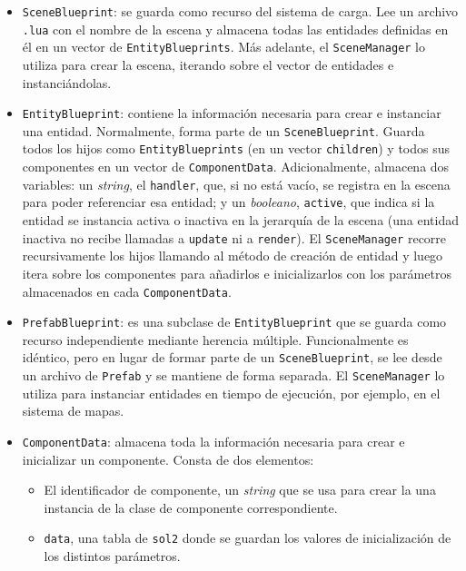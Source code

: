 \begin{itemize}
	\item \texttt{SceneBlueprint}: se guarda como recurso del sistema de carga. Lee un archivo \texttt{.lua} con el nombre de la escena y almacena todas las entidades definidas en él en un vector de \texttt{EntityBlueprints}. Más adelante, el \texttt{SceneManager} lo utiliza para crear la escena, iterando sobre el vector de entidades e instanciándolas. 
	\item \texttt{EntityBlueprint}: contiene la información necesaria para crear e instanciar una entidad. Normalmente, forma parte de un \texttt{SceneBlueprint}. Guarda todos los hijos como \texttt{EntityBlueprints} (en un vector \texttt{children}) y todos sus componentes en un vector de \texttt{ComponentData}. Adicionalmente, almacena dos variables: un \textit{string}, el \texttt{handler}, que, si no está vacío, se registra en la escena para poder referenciar esa entidad; y un \textit{booleano}, \texttt{active}, que indica si la entidad se instancia activa o inactiva en la jerarquía de la escena (una entidad inactiva no recibe llamadas a \texttt{update} ni a \texttt{render}). El \texttt{SceneManager} recorre recursivamente los hijos llamando al método de creación de entidad y luego itera sobre los componentes para añadirlos e inicializarlos con los parámetros almacenados en cada \texttt{ComponentData}. 
	\item \texttt{PrefabBlueprint}: es una subclase de \texttt{EntityBlueprint} que se guarda como recurso independiente mediante herencia múltiple. Funcionalmente es idéntico, pero en lugar de formar parte de un \texttt{SceneBlueprint}, se lee desde un archivo de \texttt{Prefab} y se mantiene de forma separada. El \texttt{SceneManager} lo utiliza para instanciar entidades en tiempo de ejecución, por ejemplo, en el sistema de mapas.
	\item \texttt{ComponentData}: almacena toda la información necesaria para crear e inicializar un componente. Consta de dos elementos: 
		\begin{itemize}
			\item El identificador de componente, un \textit{string} que se usa para crear la una instancia de la clase de componente correspondiente. 
			\item \texttt{data}, una tabla de \texttt{sol2} donde se guardan los valores de inicialización de los distintos parámetros. 
		\end{itemize}
\end{itemize}

